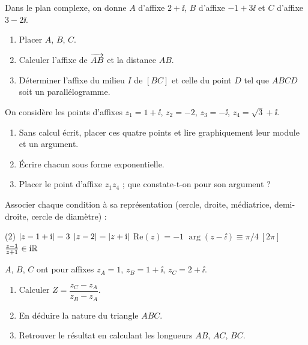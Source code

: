 Dans le plan complexe, on donne $A$ d'affixe $2 + \ii$, $B$ d'affixe
$-1 + 3\ii$ et $C$ d'affixe $3 - 2\ii$.
\begin{enumerate}
	\item Placer $A$, $B$, $C$.
	\item Calculer l'affixe de $\overrightarrow{AB}$ et la distance $AB$.
	\item Déterminer l'affixe du milieu $I$ de $[BC]$ et celle du point $D$ tel
	que $ABCD$ soit un parallélogramme.
\end{enumerate}

On considère les points d'affixes $z_1 = 1 + \ii$, $z_2 = -2$, $z_3 = -\ii$,
$z_4 = \sqrt3 + \ii$.
\begin{enumerate}
	\item Sans calcul écrit, placer ces quatre points et lire graphiquement
	leur module et un argument.
	\item Écrire chacun sous forme exponentielle.
	\item Placer le point d'affixe $z_1 z_4$ ; que constate-t-on pour son
	argument ?
\end{enumerate}

Associer chaque condition à sa représentation (cercle, droite, médiatrice,
demi-droite, cercle de diamètre) :
\begin{listecol}(2)
	\task $\left|z - 1 + \mathrm{i}\right| = 3$
	\task $\left|z - 2\right| = \left|z + \mathrm{i}\right|$
	\task $\mathrm{Re}(z) = -1$
	\task $\arg(z - \ii) \equiv \pi/4\ [2\pi]$
	\task $\frac{z - 1}{z + 1} \in \mathrm{i}\mathbb{R}$
\end{listecol}

$A$, $B$, $C$ ont pour affixes $z_A = 1$, $z_B = 1 + \ii$, $z_C = 2 + \ii$.
\begin{enumerate}
	\item Calculer $Z = \dfrac{z_C - z_A}{z_B - z_A}$.
	\item En déduire la nature du triangle $ABC$.
	\item Retrouver le résultat en calculant les longueurs $AB$, $AC$, $BC$.
\end{enumerate}

